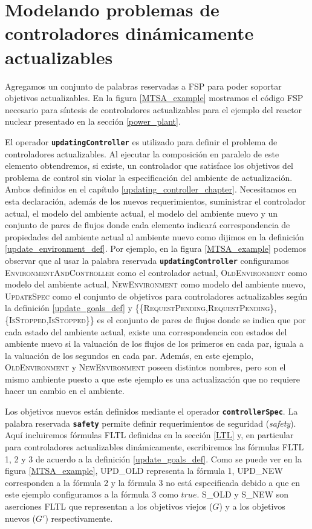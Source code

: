 \section{Modelando problemas de controladores dinámicamente actualizables}

Agregamos un conjunto de palabras reservadas a FSP para poder soportar objetivos actualizables. En la figura
\ref{MTSA_example} mostramos el código FSP necesario para síntesis de controladores actualizables para el ejemplo del reactor nuclear
presentado en la sección \ref{power_plant}.

El operador \texttt{\textbf{updatingController}} es utilizado para definir el problema de controladores
actualizables. Al ejecutar la composición en paralelo de este elemento obtendremos, si existe, un controlador que satisface los
objetivos del problema de control sin violar la especificación del ambiente de actualización. Ambos definidos en el
capítulo \ref{updating_controller_chapter}. Necesitamos en esta declaración, además de los nuevos requerimientos, suministrar
el controlador actual, el modelo del ambiente actual, el modelo del ambiente nuevo y un conjunto de pares de flujos
donde cada elemento indicará correspondencia de propiedades del ambiente actual al ambiente nuevo como dijimos en la
definición \ref{update_environment_def}. Por ejemplo, en la figura \ref{MTSA_example} podemos observar que al usar la
palabra reservada \texttt{\textbf{updatingController}} configuramos \textsc{EnvironmentAndController} como el
controlador actual, \textsc{OldEnvironment} como modelo del ambiente actual, \textsc{NewEnvironment} como modelo del
ambiente nuevo, \textsc{UpdateSpec} como el conjunto de objetivos para controladores actualizables según la
definición \ref{update_goals_def} y \textsc{\{\{RequestPending,RequestPending\},
\{IsStopped,IsStopped\}\}} es el conjunto de pares de flujos donde se indica que por cada estado del ambiente actual,
existe una correspondencia con estados del ambiente nuevo si la valuación de los flujos de los primeros en cada par,
iguala a la valuación de los segundos en cada par. Además, en este ejemplo, \textsc{OldEnvironment} y
\textsc{NewEnvironment} poseen distintos nombres, pero son el mismo ambiente puesto a que este ejemplo es una
actualización que no requiere hacer un cambio en el ambiente.

Los objetivos nuevos están definidos mediante el operador \texttt{\textbf{controllerSpec}}. La palabra reservada
\texttt{\textbf{safety}} permite definir requerimientos de seguridad (\emph{safety}). Aquí incluiremos fórmulas
FLTL definidas en la sección \ref{LTL} y, en particular para controladores actualizables dinámicamente, escribiremos las
fórmulas FLTL 1, 2 y 3 de acuerdo a la definición \ref{update_goals_def}. Como se puede ver en la figura \ref{MTSA_example},
\textsc{UPD\_OLD} representa la fórmula 1, \textsc{UPD\_NEW} corresponden a la fórmula 2 y la fórmula 3 no está
especificada debido a que en este ejemplo configuramos a la fórmula 3 como $true$. \textsc{S\_OLD} y \textsc{S\_NEW} son
aserciones FLTL que representan a los objetivos viejos ($G$) y a los objetivos nuevos ($G'$) respectivamente.

